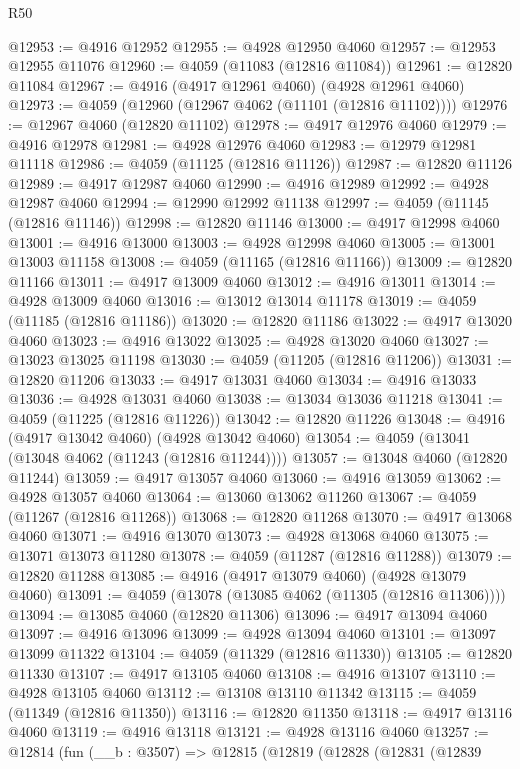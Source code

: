 \begin{lexlean}{R50}
\begin{coremodule}
@12953 := @4916 @12952
@12955 := @4928 @12950 @4060
@12957 := @12953 @12955 @11076
@12960 := @4059 (@11083 (@12816 @11084))
@12961 := @12820 @11084
@12967 := @4916 (@4917 @12961 @4060) (@4928 @12961 @4060)
@12973 := @4059 (@12960 (@12967 @4062 (@11101 (@12816 @11102))))
@12976 := @12967 @4060 (@12820 @11102)
@12978 := @4917 @12976 @4060
@12979 := @4916 @12978
@12981 := @4928 @12976 @4060
@12983 := @12979 @12981 @11118
@12986 := @4059 (@11125 (@12816 @11126))
@12987 := @12820 @11126
@12989 := @4917 @12987 @4060
@12990 := @4916 @12989
@12992 := @4928 @12987 @4060
@12994 := @12990 @12992 @11138
@12997 := @4059 (@11145 (@12816 @11146))
@12998 := @12820 @11146
@13000 := @4917 @12998 @4060
@13001 := @4916 @13000
@13003 := @4928 @12998 @4060
@13005 := @13001 @13003 @11158
@13008 := @4059 (@11165 (@12816 @11166))
@13009 := @12820 @11166
@13011 := @4917 @13009 @4060
@13012 := @4916 @13011
@13014 := @4928 @13009 @4060
@13016 := @13012 @13014 @11178
@13019 := @4059 (@11185 (@12816 @11186))
@13020 := @12820 @11186
@13022 := @4917 @13020 @4060
@13023 := @4916 @13022
@13025 := @4928 @13020 @4060
@13027 := @13023 @13025 @11198
@13030 := @4059 (@11205 (@12816 @11206))
@13031 := @12820 @11206
@13033 := @4917 @13031 @4060
@13034 := @4916 @13033
@13036 := @4928 @13031 @4060
@13038 := @13034 @13036 @11218
@13041 := @4059 (@11225 (@12816 @11226))
@13042 := @12820 @11226
@13048 := @4916 (@4917 @13042 @4060) (@4928 @13042 @4060)
@13054 := @4059 (@13041 (@13048 @4062 (@11243 (@12816 @11244))))
@13057 := @13048 @4060 (@12820 @11244)
@13059 := @4917 @13057 @4060
@13060 := @4916 @13059
@13062 := @4928 @13057 @4060
@13064 := @13060 @13062 @11260
@13067 := @4059 (@11267 (@12816 @11268))
@13068 := @12820 @11268
@13070 := @4917 @13068 @4060
@13071 := @4916 @13070
@13073 := @4928 @13068 @4060
@13075 := @13071 @13073 @11280
@13078 := @4059 (@11287 (@12816 @11288))
@13079 := @12820 @11288
@13085 := @4916 (@4917 @13079 @4060) (@4928 @13079 @4060)
@13091 := @4059 (@13078 (@13085 @4062 (@11305 (@12816 @11306))))
@13094 := @13085 @4060 (@12820 @11306)
@13096 := @4917 @13094 @4060
@13097 := @4916 @13096
@13099 := @4928 @13094 @4060
@13101 := @13097 @13099 @11322
@13104 := @4059 (@11329 (@12816 @11330))
@13105 := @12820 @11330
@13107 := @4917 @13105 @4060
@13108 := @4916 @13107
@13110 := @4928 @13105 @4060
@13112 := @13108 @13110 @11342
@13115 := @4059 (@11349 (@12816 @11350))
@13116 := @12820 @11350
@13118 := @4917 @13116 @4060
@13119 := @4916 @13118
@13121 := @4928 @13116 @4060
@13257 := @12814
    (fun (__b : @3507) =>
    @12815
      (@12819
        (@12828
          (@12831
            (@12839

\end{coremodule}
\end{lexlean}
